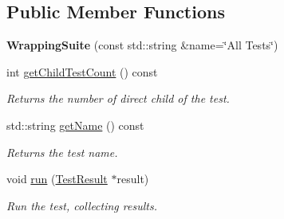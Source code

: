 \subsection*{Public Member Functions}
\begin{DoxyCompactItemize}
\item 
\hypertarget{class_test_runner_1_1_wrapping_suite_a3edce0cce0e3fdc996994d3dfe8f35fb}{{\bfseries Wrapping\-Suite} (const std\-::string \&name=\char`\"{}All Tests\char`\"{})}\label{class_test_runner_1_1_wrapping_suite_a3edce0cce0e3fdc996994d3dfe8f35fb}

\item 
\hypertarget{class_test_runner_1_1_wrapping_suite_a5ef6d3d00fbc6493c06a2dc1f0e93077}{int \hyperlink{class_test_runner_1_1_wrapping_suite_a5ef6d3d00fbc6493c06a2dc1f0e93077}{get\-Child\-Test\-Count} () const }\label{class_test_runner_1_1_wrapping_suite_a5ef6d3d00fbc6493c06a2dc1f0e93077}

\begin{DoxyCompactList}\small\item\em Returns the number of direct child of the test. \end{DoxyCompactList}\item 
std\-::string \hyperlink{class_test_runner_1_1_wrapping_suite_a500c7e2413a4830b87d8ab061251f856}{get\-Name} () const 
\begin{DoxyCompactList}\small\item\em Returns the test name. \end{DoxyCompactList}\item 
\hypertarget{class_test_runner_1_1_wrapping_suite_aa486bfea64b60206ac1d8fbb006f2f64}{void \hyperlink{class_test_runner_1_1_wrapping_suite_aa486bfea64b60206ac1d8fbb006f2f64}{run} (\hyperlink{class_test_result}{Test\-Result} $\ast$result)}\label{class_test_runner_1_1_wrapping_suite_aa486bfea64b60206ac1d8fbb006f2f64}

\begin{DoxyCompactList}\small\item\em Run the test, collecting results. \end{DoxyCompactList}\end{DoxyCompactItemize}
